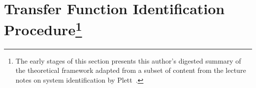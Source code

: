 % 

% 

\section[Transfer Function Identification Procedure]{Transfer Function Identification Procedure\footnote{The early stages of this section presents this author's digested summary of the theoretical framework adapted from a subset of content from the lecture notes on system identification by Plett~\cite{PlettECE5560_02,PlettECE5560_03,PlettECE5560_04}.}}\label{sec:actualsysid}








